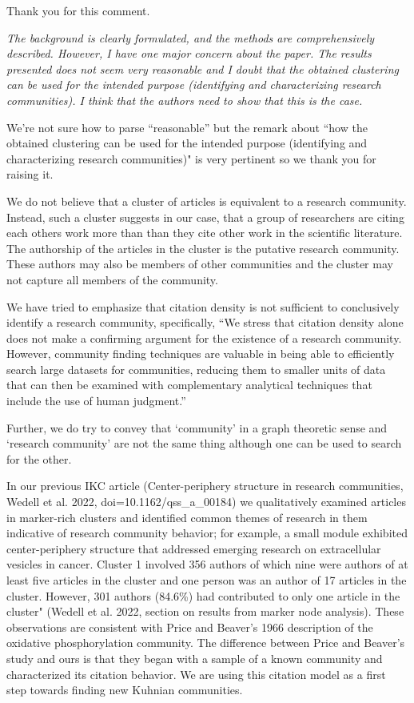 \documentclass[11pt, oneside]{article}   	%
\begin{document}
Thank you for this comment.

\emph{The background is clearly formulated, and the methods are comprehensively described. However, I have one major concern about the paper. The results presented does not seem very reasonable and I doubt that the obtained clustering can be used for the intended purpose (identifying and characterizing research communities). I think that the authors need to show that this is the case.}

We're not sure how to parse ``reasonable'' but the remark about ``how the obtained clustering can be used for the intended purpose (identifying and characterizing research communities)" is very pertinent so we thank you for raising it. 

We do not believe that a cluster of articles is equivalent to a research community. Instead, such a cluster suggests in our case, that a group of researchers are citing each others work more than than they cite other work in the scientific literature. The authorship of the articles in the cluster is the putative research community. These authors may also be members of other communities and the cluster may not capture all members of the community. 

We have tried to emphasize that citation density is not sufficient to conclusively identify a research community, specifically, ``We stress that citation density alone does not make a confirming argument for the existence of a research community. However, community finding techniques are valuable in being able to efficiently search large datasets for communities, reducing them to smaller units of data that can then be examined with complementary analytical techniques that include the use of human judgment.''

Further, we do try to convey that `community' in a graph theoretic sense and `research community' are not the same thing although one can be used to search for the other. 

In our previous IKC article (Center-periphery structure in research communities, Wedell et al. 2022, doi=10.1162/qss\_a\_00184) we qualitatively examined articles in marker-rich clusters and identified common themes of research in them indicative of research community behavior; for example, a small module exhibited center-periphery structure that addressed emerging research on extracellular vesicles in cancer. Cluster 1 involved 356 authors of which nine were authors of at least five articles in the cluster and one person was an author of 17 articles in the cluster. However, 301 authors (84.6\%) had contributed to only one article in the cluster" (Wedell et al. 2022, section on results from marker node analysis). These observations are consistent with Price and Beaver's 1966 description of the oxidative phosphorylation community. The difference between Price and Beaver's study and ours is that they began with a sample of a known community and characterized its citation behavior. We are using this citation model as a first step towards finding new Kuhnian communities. 
\end{document}
